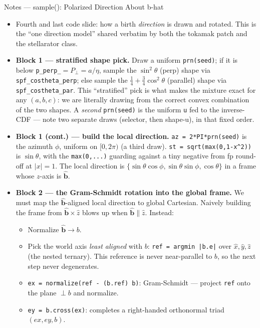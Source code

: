 \documentclass[11pt,aspectratio=169]{beamer}
\newcommand{\bhat}{\hat{\mathbf{b}}}
\begin{document}
\begin{frame}[allowframebreaks]{Notes --- sample(): Polarized Direction About b-hat}
{\color{red}\footnotesize
\begin{itemize}
\item Fourth and last code slide: how a birth \emph{direction} is drawn and rotated. This is the
      ``one direction model'' shared verbatim by both the tokamak patch and the stellarator class.
\item \textbf{Block 1 --- stratified shape pick.} Draw a uniform \texttt{prn(seed)}; if it is below
      \texttt{p\_perp\_}$=P_\perp=a/\eta$, sample the $\sin^2\theta$ (perp) shape via
      \texttt{spf\_costheta\_perp}; else sample the $\tfrac14+\tfrac34\cos^2\theta$ (parallel) shape
      via \texttt{spf\_costheta\_par}. This ``stratified'' pick is what makes the mixture exact for
      any $(a,b,c)$: we are literally drawing from the correct convex combination of the two shapes.
      A \emph{second} \texttt{prn(seed)} is the uniform \texttt{u} fed to the inverse-CDF ---
      note two separate draws (selector, then shape-u), in that fixed order.
\item \textbf{Block 1 (cont.) --- build the local direction.} \texttt{az = 2*PI*prn(seed)} is the
      azimuth $\phi$, uniform on $[0,2\pi)$ (a third draw). \texttt{st = sqrt(max(0,1-x\^{}2))} is
      $\sin\theta$, with the \texttt{max(0,...)} guarding against a tiny negative from fp round-off at
      $|x|=1$. The local direction is $\{\sin\theta\cos\phi, \sin\theta\sin\phi, \cos\theta\}$ in a
      frame whose $z$-axis is $\bhat$.
\item \textbf{Block 2 --- the Gram-Schmidt rotation into the global frame.} We must map the
      $\bhat$-aligned local direction to global Cartesian. Naively building the frame from
      $\bhat\times\hat z$ blows up when $\bhat\parallel\hat z$. Instead:
      \begin{itemize}\scriptsize
      \item Normalize $\bhat\to b$.
      \item Pick the world axis \emph{least aligned} with $b$: \texttt{ref = argmin |b.e|} over
            $\hat x,\hat y,\hat z$ (the nested ternary). This reference is never near-parallel to
            $b$, so the next step never degenerates.
      \item \texttt{ex = normalize(ref - (b.ref) b)}: Gram-Schmidt --- project \texttt{ref} onto the
            plane $\perp b$ and normalize.
      \item \texttt{ey = b.cross(ex)}: completes a right-handed orthonormal triad $(ex,ey,b)$.

\end{itemize}
\end{itemize}}
\end{frame}
\end{document}
